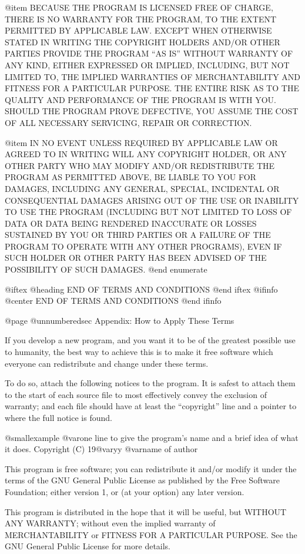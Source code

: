 @item
BECAUSE THE PROGRAM IS LICENSED FREE OF CHARGE, THERE IS NO WARRANTY
FOR THE PROGRAM, TO THE EXTENT PERMITTED BY APPLICABLE LAW.  EXCEPT WHEN
OTHERWISE STATED IN WRITING THE COPYRIGHT HOLDERS AND/OR OTHER PARTIES
PROVIDE THE PROGRAM ``AS IS'' WITHOUT WARRANTY OF ANY KIND, EITHER EXPRESSED
OR IMPLIED, INCLUDING, BUT NOT LIMITED TO, THE IMPLIED WARRANTIES OF
MERCHANTABILITY AND FITNESS FOR A PARTICULAR PURPOSE.  THE ENTIRE RISK AS
TO THE QUALITY AND PERFORMANCE OF THE PROGRAM IS WITH YOU.  SHOULD THE
PROGRAM PROVE DEFECTIVE, YOU ASSUME THE COST OF ALL NECESSARY SERVICING,
REPAIR OR CORRECTION.

@item
IN NO EVENT UNLESS REQUIRED BY APPLICABLE LAW OR AGREED TO IN WRITING WILL
ANY COPYRIGHT HOLDER, OR ANY OTHER PARTY WHO MAY MODIFY AND/OR
REDISTRIBUTE THE PROGRAM AS PERMITTED ABOVE, BE LIABLE TO YOU FOR DAMAGES,
INCLUDING ANY GENERAL, SPECIAL, INCIDENTAL OR CONSEQUENTIAL DAMAGES
ARISING OUT OF THE USE OR INABILITY TO USE THE PROGRAM (INCLUDING BUT NOT
LIMITED TO LOSS OF DATA OR DATA BEING RENDERED INACCURATE OR LOSSES
SUSTAINED BY YOU OR THIRD PARTIES OR A FAILURE OF THE PROGRAM TO OPERATE
WITH ANY OTHER PROGRAMS), EVEN IF SUCH HOLDER OR OTHER PARTY HAS BEEN
ADVISED OF THE POSSIBILITY OF SUCH DAMAGES.
@end enumerate

@iftex
@heading END OF TERMS AND CONDITIONS
@end iftex
@ifinfo
@center END OF TERMS AND CONDITIONS
@end ifinfo

@page
@unnumberedsec Appendix: How to Apply These Terms

  If you develop a new program, and you want it to be of the greatest
possible use to humanity, the best way to achieve this is to make it
free software which everyone can redistribute and change under these
terms.

  To do so, attach the following notices to the program.  It is safest to
attach them to the start of each source file to most effectively convey
the exclusion of warranty; and each file should have at least the
``copyright'' line and a pointer to where the full notice is found.

@smallexample
@var{one line to give the program's name and a brief idea of what it does.}
Copyright (C) 19@var{yy}  @var{name of author}

This program is free software; you can redistribute it and/or modify
it under the terms of the GNU General Public License as published by
the Free Software Foundation; either version 1, or (at your option)
any later version.

This program is distributed in the hope that it will be useful,
but WITHOUT ANY WARRANTY; without even the implied warranty of
MERCHANTABILITY or FITNESS FOR A PARTICULAR PURPOSE.  See the
GNU General Public License for more details.

